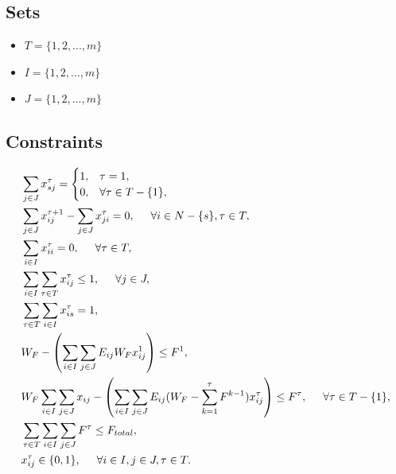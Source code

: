 \subsection*{Sets}
\begin{itemize}
    \item $T = \{1,2,...,m\}$
    \item $I = \{1,2,...,m\}$
    \item $J = \{1,2,...,m\}$
\end{itemize}
\subsection*{Constraints}
\begin{align}
&\sum_{j\in J} x_{sj}^{\tau} = \begin{cases} 
1, & \tau = 1,\\
0, & \forall\tau\in T-\{1\}, \end{cases} \label{cons:comefromsource}\\
&\sum_{j\in J} x_{ij}^{\tau+1}-\sum_{j\in J}x^{\tau}_{ji} = 0, \hspace{0.5cm} \forall i\in N-\{s\},\tau \in T, \label{cons:outtoin}\\
&\sum_{i\in I}x_{ii}^{\tau} = 0, \hspace{0.5cm} \forall \tau \in T, \label{cons:self}\\
&\sum_{i\in I}\sum_{\tau\in T} x_{ij}^\tau\leq 1, \hspace{0.5cm} \forall j \in J,\label{cons:do not revisit}\\
&\sum_{\tau\in T}\sum_{i\in I} x_{is}^\tau = 1,\label{cons:return}\\
&W_F-\left(\sum_{i\in I}\sum_{j\in J}E_{ij}W_Fx_{ij}^1\right) \leq F^{1}, \label{cons:fuelstart}\\
&W_F\sum_{i\in I}\sum_{j\in J}x_{ij}-\left(\sum_{i\in I}\sum_{j\in J}E_{ij}(W_F-\sum_{k = 1}^{\tau}F^{k-1})x_{ij}^{\tau}\right) \leq F^{\tau}, \hspace{.5cm} \forall \tau \in T-\{1\},\label{cons:fuelnext}\\
&\sum_{\tau\in T}\sum_{i\in I}\sum_{j\in J} F^{\tau} \leq F_{total},\label{cons:fueltotal}\\
&x_{ij}^{\tau}\in \{0,1\}, \hspace{0.5cm} \forall i\in I,j\in J,\tau\in T\label{cons:binary}.
\end{align}
